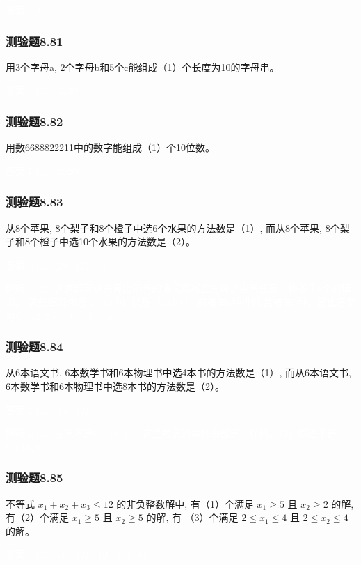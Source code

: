 \documentclass[UTF8, heading=true]{ctexart}
\begin{document}
\textcolor{white}{答案：A}

\subsubsection{测验题8.81}

用3个字母a, 2个字母b和5个c能组成（1）个长度为10的字母串。

\textcolor{white}{答案：（1） 2520}

\subsubsection{测验题8.82}
用数6688822211中的数字能组成（1）个10位数。

\textcolor{white}{答案：（1） 25200}

\subsubsection{测验题8.83}

从8个苹果, 8个梨子和8个橙子中选6个水果的方法数是（1）, 而从8个苹果, 8个梨子和8个橙子中选10个水果的方法数是（2）。

\textcolor{white}{答案：（1） 28 （2） 57}

\textcolor{white}{解析：（2）这道题可以先算出所有的情况再减去三种之中有任意一种多于8个的情况。
这些情况包含：（9,1,0）以及（10,0,0）,前者有6种排列,后者有3种。因此答案为$C(12,2)-6-3=57$.}
\subsubsection{测验题8.84}

从6本语文书, 6本数学书和6本物理书中选4本书的方法数是（1）, 而从6本语文书, 6本数学书和6本物理书中选8本书的方法数是（2）。

\textcolor{white}{答案：（1） 15 （2） 36}

\textcolor{white}{解析：（1）注意不是$C(18,4)$, 这里考虑的每种书都是一样的。（2）同理不是$C(18,8)$。}


\subsubsection{测验题8.85}

不等式 $x_1+x_2+x_3 \leq 12$ 的非负整数解中, 有（1）个满足 $x_1 \geq 5$ 且 $x_2 \geq 2$ 的解, 有（2）个满足 $x_1 \geq 5$ 且 $x_2 \geq 5$ 的解, 有 （3）个满足 $2 \leq x_1 \leq 4$ 且 $2 \leq x_2 \leq 4$ 的解。

\textcolor{white}{答案：（1） 56 （2） 10 （3） 63}
\end{document}
